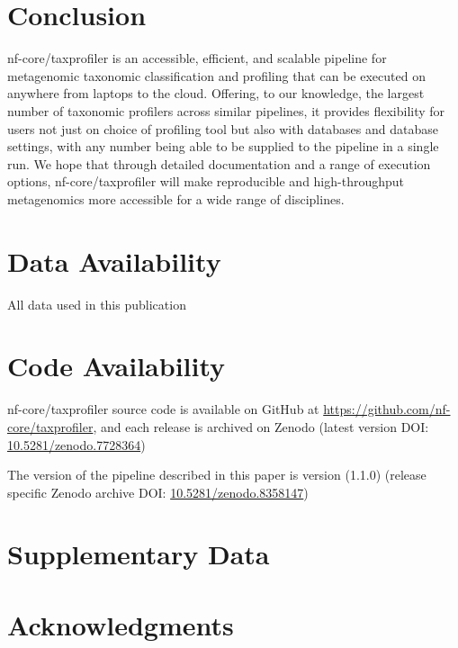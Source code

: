 \documentclass[
]{article}
\begin{document}
\hypertarget{conclusion}{%
\section{Conclusion}\label{conclusion}}

nf-core/taxprofiler is an accessible, efficient, and scalable pipeline
for metagenomic taxonomic classification and profiling that can be
executed on anywhere from laptops to the cloud. Offering, to our
knowledge, the largest number of taxonomic profilers across similar
pipelines, it provides flexibility for users not just on choice of
profiling tool but also with databases and database settings, with any
number being able to be supplied to the pipeline in a single run. We
hope that through detailed documentation and a range of execution
options, nf-core/taxprofiler will make reproducible and high-throughput
metagenomics more accessible for a wide range of disciplines.

\hypertarget{data-availability}{%
\section{Data Availability}\label{data-availability}}

All data used in this publication

\hypertarget{code-availability}{%
\section{Code Availability}\label{code-availability}}

nf-core/taxprofiler source code is available on GitHub at
\url{https://github.com/nf-core/taxprofiler}, and each release is
archived on Zenodo (latest version DOI:
\href{https://doi.org/10.5281/zenodo.7728364}{10.5281/zenodo.7728364})

The version of the pipeline described in this paper is version (1.1.0)
(release specific Zenodo archive DOI:
\href{https://doi.org/10.5281/zenodo.8358147}{10.5281/zenodo.8358147})

\hypertarget{supplementary-data}{%
\section{Supplementary Data}\label{supplementary-data}}

\hypertarget{acknowledgments}{%
\section{Acknowledgments}\label{acknowledgments}}
\end{document}
